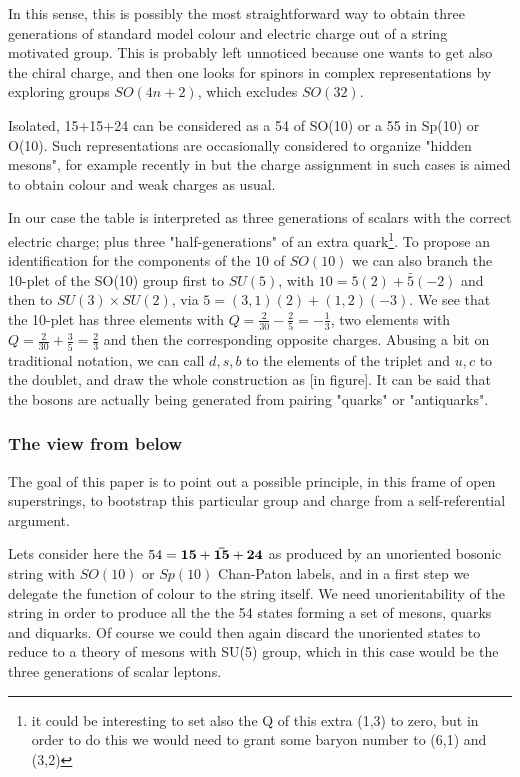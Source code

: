 \documentclass[a4paper]{article}
\begin{document}
In this sense, this is possibly the most straightforward way to obtain
three generations of standard model colour and electric charge out
of a string motivated group. This is probably left unnoticed because
one wants to get also the chiral charge, and then one looks for spinors 
in complex representations by exploring groups $SO(4n +2)$, which
excludes $SO(32)$.   

Isolated, 15+15+24 can be considered as a 54 of SO(10) or a 55 in Sp(10)
or O(10). Such representations are occasionally considered to organize "hidden mesons", for example recently in \cite{Arkani-Hamed:2016kpz,Yamatsu:2015npn} but 
the charge assignment in such cases is aimed to obtain colour and weak
charges as usual. 

In our case the table is interpreted as three generations of scalars with the correct electric
charge; plus three "half-generations" of an extra quark\footnote{it could be interesting to set also
the Q of this extra (1,3) to zero, but in order to do this we would need to grant some baryon number to (6,1) and (3,2)}.  To propose an identification for the components of
the $10$ of $SO(10)$ we can also branch the 10-plet of the SO(10) group first to $SU(5)$,
with $10 = 5 (2) + \bar 5 (-2)$ and then to $SU(3) \times SU(2)$,
via $5 = (3, 1)(2) + (1,2) (-3)$. We see that the 10-plet has three elements with $Q=\frac 2{30} - \frac 2{5} = -\frac 13$, two elements with $Q=\frac 2{30} + \frac 3{5} = \frac 23$  and then the corresponding opposite charges. Abusing a bit
on traditional notation, we can call $d,s,b$ to the
elements of the triplet and $u,c$ to the doublet, and draw the whole construction as [in figure]. It can be said that the bosons are actually being 
generated from pairing "quarks" or "antiquarks".

\subsubsection*{The view from below}

The goal of this paper is to point out a possible principle,
in this frame of open superstrings, to bootstrap this particular group
and charge from a self-referential argument. 

Lets consider here the $54=\bf 15+\bar {15}+24$ as produced by an unoriented bosonic string with $SO(10)$ or $Sp(10)$ Chan-Paton labels, and in a 
first step we delegate the
function  of colour to the string itself. We need unorientability of
the string in order to produce 
all the the 54 states forming a set of mesons, quarks and diquarks. 
Of course we could then again discard the unoriented states to reduce 
to a theory of mesons with SU(5) group, which in this case would be the three generations of scalar leptons.
\end{document}
